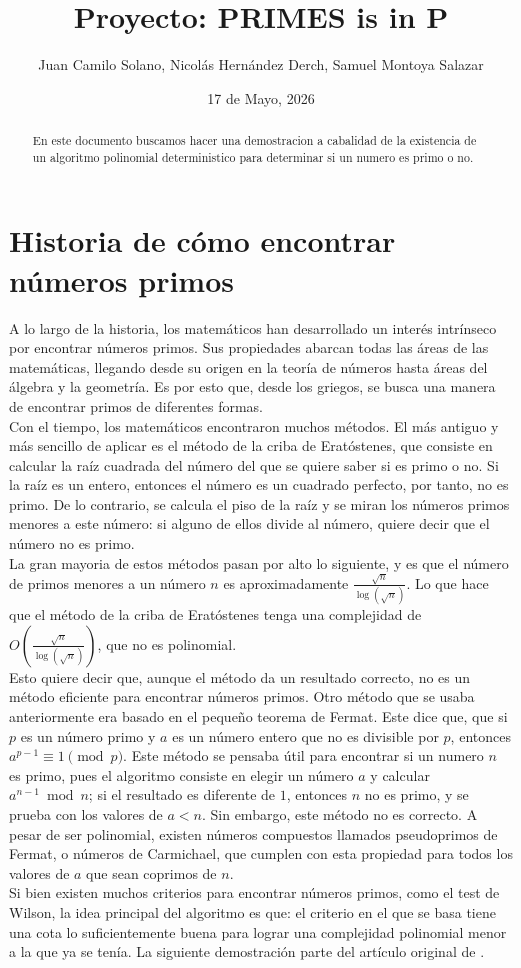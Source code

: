 \documentclass{article}
\title{Proyecto: PRIMES is in P}
\author{Juan Camilo Solano, Nicolás Hernández Derch, Samuel Montoya Salazar}
\date{17 de Mayo, 2026}
\begin{document}
\maketitle

\begin{abstract}
    En este documento buscamos hacer una demostracion a cabalidad de la existencia de un algoritmo polinomial
    deterministico para determinar si un numero es primo o no.
\end{abstract}

\section{Historia de cómo encontrar números primos}
A lo largo de la historia, los matemáticos han desarrollado un
interés intrínseco por encontrar números primos. Sus propiedades
abarcan todas las áreas de las matemáticas, llegando desde su
origen en la teoría de números hasta áreas del álgebra y la
geometría. Es por esto que, desde los griegos, se busca una manera
de encontrar primos de diferentes formas.\\
Con el tiempo, los matemáticos encontraron muchos métodos. El más antiguo
y más sencillo de aplicar es el método de la criba de Eratóstenes, que
consiste en calcular la raíz cuadrada del número del que se quiere saber
si es primo o no. Si la raíz es un entero, entonces el número es un cuadrado
perfecto, por tanto, no es primo. De lo contrario, se calcula el piso de la raíz y
se miran los números primos menores a este número: si alguno de ellos
divide al número, quiere decir que el número no es primo.\\
La gran mayoria de estos métodos pasan por alto lo siguiente,
y es que el número de primos menores a un número $n$ es aproximadamente
$\frac{\sqrt{n}}{\log(\sqrt{n})}$. Lo que hace que el método de la criba de
Eratóstenes tenga una complejidad de $\mathit{O}\!\left(\frac{\sqrt{n}}{\log(\sqrt{n})}\right)$,
que no es polinomial.\\
Esto quiere decir que, aunque el método da un resultado
correcto, no es un método eficiente para encontrar números primos.
Otro método que se usaba anteriormente era basado en el pequeño teorema
de Fermat. Este dice que, que si $p$ es un número primo y $a$ es un número entero
que no es divisible por $p$, entonces $a^{p-1} \equiv 1 \pmod{p}$. Este método
se pensaba útil para encontrar si un numero $n$ es primo, pues el algoritmo consiste en
elegir un número $a$ y calcular $a^{n-1} \bmod n$; si el resultado es diferente de $1$, entonces $n$ no es primo,
y se prueba con los valores de $a<n$. Sin embargo, este método no es correcto. A pesar de ser polinomial, existen números compuestos llamados pseudoprimos de Fermat, o números de Carmichael, que cumplen con
esta propiedad para todos los valores de $a$ que sean coprimos de $n$.\\
Si bien existen muchos criterios para encontrar números primos, como el test de Wilson, la idea principal del algoritmo
es que: el criterio en el que se basa tiene una cota lo suficientemente buena para
lograr una complejidad polinomial menor a la que ya se tenía.
La siguiente demostración parte del artículo original de \cite{AKS04}.
\end{document}

